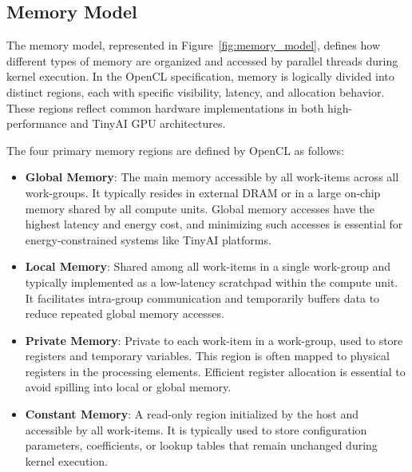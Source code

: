         \subsection{Memory Model}
        
            The memory model, represented in Figure~\ref{fig:memory_model}, defines how different types of memory are organized and accessed by parallel threads during kernel execution. In the OpenCL specification, memory is logically divided into distinct regions, each with specific visibility, latency, and allocation behavior. These regions reflect common hardware implementations in both high-performance and TinyAI GPU architectures.

            The four primary memory regions are defined by OpenCL as follows:

            \vspace{-1em}
            \begin{itemize}
                \item \textbf{Global Memory}: The main memory accessible by all work-items across all work-groups. It typically resides in external DRAM or in a large on-chip memory shared by all compute units. Global memory accesses have the highest latency and energy cost, and minimizing such accesses is essential for energy-constrained systems like TinyAI platforms.
            
                \item \textbf{Local Memory}: Shared among all work-items in a single work-group and typically implemented as a low-latency scratchpad within the compute unit. It facilitates intra-group communication and temporarily buffers data to reduce repeated global memory accesses.
            
                \item \textbf{Private Memory}: Private to each work-item in a work-group, used to store registers and temporary variables. This region is often mapped to physical registers in the processing elements. Efficient register allocation is essential to avoid spilling into local or global memory.
            
                \item \textbf{Constant Memory}: A read-only region initialized by the host and accessible by all work-items. It is typically used to store configuration parameters, coefficients, or lookup tables that remain unchanged during kernel execution.
            \end{itemize}
            \vspace{-1em}
            
